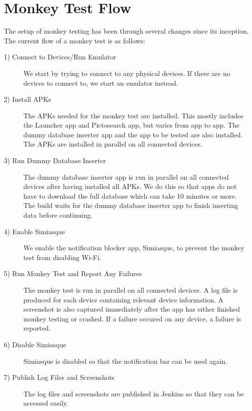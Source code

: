 \section{Monkey Test Flow}\label{sec:monkey_test_flow}
The setup of monkey testing has been through several changes since its inception. The current flow of a monkey test is as follows:

\begin{description}
  \item[1) Connect to Devices/Run Emulator] We start by trying to connect to any physical devices. If there are no devices to connect to, we start an emulator instead.
  \item[2) Install APKs] The APKs needed for the monkey test are installed. This mostly includes the Launcher app and Pictosearch app, but varies from app to app. The dummy database inserter app and the app to be tested are also installed. The APKs are installed in parallel on all connected devices.
  \item[3) Run Dummy Database Inserter] The dummy database inserter app is run in parallel on all connected devices after having installed all APKs. We do this so that apps do not have to download the full database which can take 10 minutes or more. The build waits for the dummy database inserter app to finish inserting data before continuing.
  \item[4) Enable Simiasque] We enable the notification blocker app, Simiasque, to prevent the monkey test from disabling Wi-Fi.
  \item[5) Run Monkey Test and Report Any Failures] The monkey test is run in parallel on all connected devices. A log file is produced for each device containing relevant device information. A screenshot is also captured immediately after the app has either finished monkey testing or crashed. If a failure occured on any device, a failure is reported.
  \item[6) Disable Simiasque] Simiasque is disabled so that the notification bar can be used again.
  \item[7) Publish Log Files and Screenshots] The log files and screenshots are published in Jenkins so that they can be accessed easily.
\end{description}